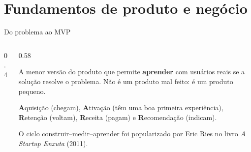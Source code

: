 \section{Fundamentos de produto e negócio}

\begin{frame}{Do problema ao MVP}
  \begin{columns}[c]
    \begin{column}{0.4\textwidth}
      \centering
    \end{column}
    \begin{column}{0.58\textwidth}
      \begin{definicao}
        A menor versão do produto que permite \textbf{aprender} com usuários reais se a solução resolve o problema. Não é um produto mal feito: é um produto pequeno.
      \end{definicao}
      \begin{conceito}
        \textbf{A}quisição (chegam), \textbf{A}tivação (têm uma boa primeira experiência), \textbf{R}etenção (voltam), \textbf{R}eceita (pagam) e \textbf{R}ecomendação (indicam).
      \end{conceito}
      \begin{historia}
        O ciclo construir--medir--aprender foi popularizado por Eric Ries no livro \emph{A Startup Enxuta} (2011).
      \end{historia}
    \end{column}
  \end{columns}
\end{frame}

